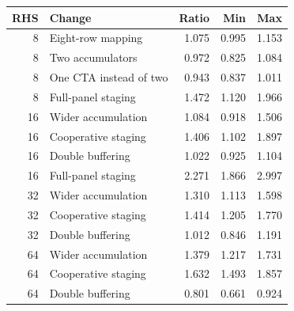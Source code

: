 \begin{tabular}{rlrrr}
\toprule
RHS & Change & Ratio & Min & Max \\
\midrule
8 & Eight-row mapping & 1.075 & 0.995 & 1.153 \\
8 & Two accumulators & 0.972 & 0.825 & 1.084 \\
8 & One CTA instead of two & 0.943 & 0.837 & 1.011 \\
8 & Full-panel staging & 1.472 & 1.120 & 1.966 \\
16 & Wider accumulation & 1.084 & 0.918 & 1.506 \\
16 & Cooperative staging & 1.406 & 1.102 & 1.897 \\
16 & Double buffering & 1.022 & 0.925 & 1.104 \\
16 & Full-panel staging & 2.271 & 1.866 & 2.997 \\
32 & Wider accumulation & 1.310 & 1.113 & 1.598 \\
32 & Cooperative staging & 1.414 & 1.205 & 1.770 \\
32 & Double buffering & 1.012 & 0.846 & 1.191 \\
64 & Wider accumulation & 1.379 & 1.217 & 1.731 \\
64 & Cooperative staging & 1.632 & 1.493 & 1.857 \\
64 & Double buffering & 0.801 & 0.661 & 0.924 \\
\bottomrule
\end{tabular}

